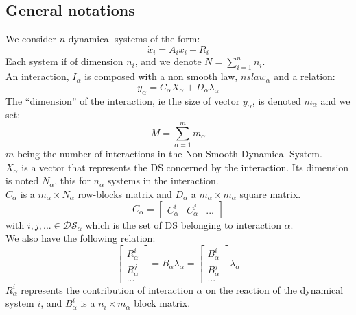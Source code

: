 \documentclass[10pt]{report}
\begin{document}
\subsection{General notations}
We consider $n$ dynamical systems of the form:
\begin{equation}
\dot x_i = A_i x_i + R_i
\end{equation}
Each system if of dimension $n_i$, and we denote $N = \displaystyle{\sum_{i=1}^{n} n_i}$. \\
An interaction, $I_{\alpha}$ is composed with a non smooth law, $nslaw_{\alpha}$ and a relation:
\begin{equation}
y_{\alpha} = C_{\alpha}X_{\alpha} + D_{\alpha}\lambda_{\alpha}
\end{equation}
The ``dimension'' of the interaction, ie the size of vector $y_{\alpha}$, is denoted $m_{\alpha}$ and we set:
$$ M = \sum_{\alpha=1}^{m} m_{\alpha}$$
$m$ being the number of interactions in the Non Smooth Dynamical System.  \\
$X_{\alpha}$ is a vector that represents the DS concerned by the interaction. Its dimension is noted $N_{\alpha}$, this for $n_{\alpha}$ systems in the interaction. \\
$C_{\alpha}$ is a $m_{\alpha} \times N_{\alpha}$ row-blocks matrix and $D_{\alpha}$ a $m_{\alpha} \times m_{\alpha}$ square matrix. \\
\begin{equation}
C_{\alpha}=\left[\begin{array}{ccc}
C_{\alpha}^i & C_{\alpha}^j & ...\end{array}\right]
\end{equation}
with $i,j,...\in \mathcal{DS}_{\alpha}$ which is the set of DS belonging to interaction $\alpha$.\\
We also have the following relation:
\begin{equation}
\left[\begin{array}{c}
R_{\alpha}^i \\
R_{\alpha}^j \\
...
\end{array}\right] = B_{\alpha}\lambda_{\alpha}
=\left[\begin{array}{c}
B_{\alpha}^i \\
B_{\alpha}^j \\
...
\end{array}\right]\lambda_{\alpha}
\end{equation}
$R_{\alpha}^i$ represents the contribution of interaction $\alpha$ on the reaction of the dynamical system $i$, and $B_{\alpha}^i$ is a $n_i \times m_{\alpha}$ block matrix. \\
\end{document}
